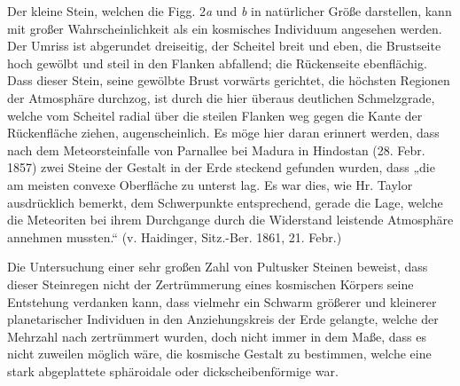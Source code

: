 \documentclass[a4paper, 11pt, oneside, german]{article}
\begin{document}
Der kleine Stein, welchen die Figg. 2\emph{a} und \emph{b} in natürlicher Größe darstellen, kann mit großer Wahrscheinlichkeit als ein kosmisches Individuum angesehen werden. Der Umriss ist abgerundet dreiseitig, der Scheitel breit und eben, die Brustseite hoch gewölbt und steil in den Flanken abfallend; die Rückenseite ebenflächig. Dass dieser Stein, seine gewölbte Brust vorwärts gerichtet, die höchsten Regionen der Atmosphäre durchzog, ist durch die hier überaus deutlichen Schmelzgrade, welche vom Scheitel radial über die steilen Flanken weg gegen die Kante der Rückenfläche ziehen, augenscheinlich. Es möge hier daran erinnert werden, dass nach dem Meteorsteinfalle von Parnallee bei Madura in Hindostan (28. Febr. 1857) zwei Steine der Gestalt in der Erde steckend gefunden wurden, dass „die am meisten convexe Oberfläche zu unterst lag. Es war dies, wie Hr. Taylor ausdrücklich bemerkt, dem Schwerpunkte entsprechend, gerade die Lage, welche die Meteoriten bei ihrem Durchgange durch die Widerstand leistende Atmosphäre annehmen mussten.“ (v. Haidinger, Sitz.-Ber. 1861, 21. Febr.)

Die Untersuchung einer sehr großen Zahl von Pultusker Steinen beweist, dass dieser Steinregen nicht der Zertrümmerung eines kosmischen Körpers seine Entstehung verdanken kann, dass vielmehr ein Schwarm größerer und kleinerer planetarischer Individuen in den Anziehungskreis der Erde gelangte, welche der Mehrzahl nach zertrümmert wurden, doch nicht immer in dem Maße, dass es nicht zuweilen möglich wäre, die kosmische Gestalt zu bestimmen, welche eine stark abgeplattete sphäroidale oder dickscheibenförmige war.
\end{document}
